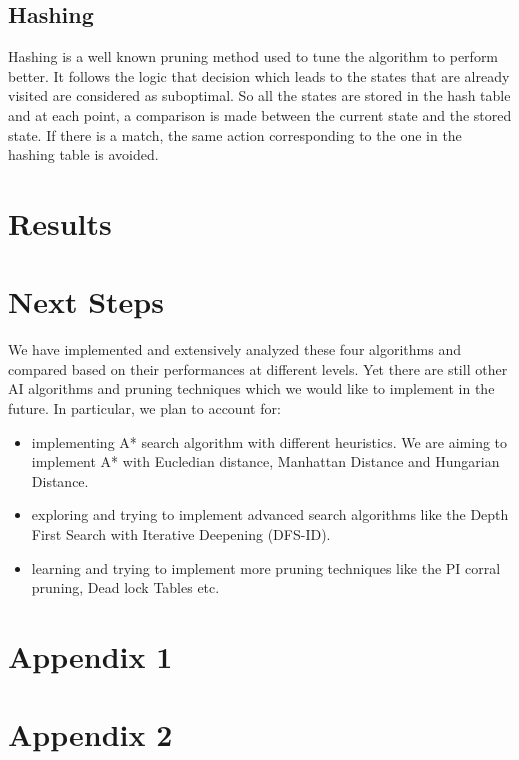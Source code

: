 \documentclass[10pt, final]{article}
\begin{document}
\subsection{Hashing}
Hashing is a well known pruning method used to tune the algorithm to perform better. It follows the logic that decision which leads to the states that are already visited are considered as suboptimal. So all the states are stored in the hash table and at each point, a comparison is made between the current state and the stored state. If there is a match, the same action corresponding to the one in the hashing table is avoided.
\section{Results}
\section{Next Steps}
We have implemented and extensively analyzed these four algorithms and compared based on their performances at different levels. Yet there are still other AI algorithms and pruning techniques which we would like to implement in the future. In particular, we plan to account for:
\begin{itemize}
\item implementing A* search algorithm with different heuristics. We are aiming to implement A* with Eucledian distance, Manhattan Distance and Hungarian Distance.
\item exploring and trying to implement advanced search algorithms like the Depth First Search with Iterative Deepening (DFS-ID).
\item learning and trying to implement more pruning techniques like the PI corral pruning, Dead lock Tables etc.
\end{itemize}

\newpage

\section{Appendix 1}


\newpage

\section{Appendix 2}
\end{document}
